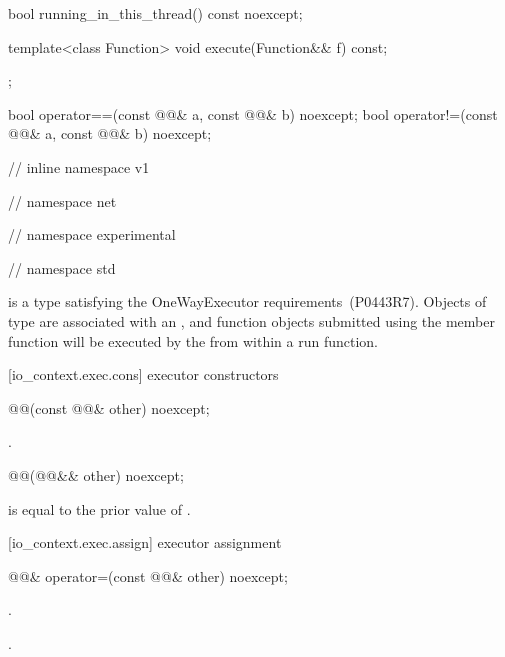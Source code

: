 \begin{codeblock}
{{{{{    bool running_in_this_thread() const noexcept;

    template<class Function>
      void execute(Function&& f) const;
  };

  bool operator==(const @@& a, const @@& b) noexcept;
  bool operator!=(const @@& a, const @@& b) noexcept;

} // inline namespace v1
} // namespace net
} // namespace experimental
} // namespace std
\end{codeblock}

\pnum
{} is a type satisfying the OneWayExecutor requirements~(P0443R7). Objects of type  are associated with an , and function objects submitted using the  member function will be executed by the  from within a run function.


[io_context.exec.cons]{ executor constructors}

%
\begin{itemdecl}
@@(const @@& other) noexcept;
\end{itemdecl}

\begin{itemdescr}
\pnum
\postconditions {}.
\end{itemdescr}

\begin{itemdecl}
@@(@@&& other) noexcept;
\end{itemdecl}

\begin{itemdescr}
\pnum
\postconditions {} is equal to the prior value of .
\end{itemdescr}



[io_context.exec.assign]{ executor assignment}

%
\begin{itemdecl}
@@& operator=(const @@& other) noexcept;
\end{itemdecl}

\begin{itemdescr}
\pnum
\postconditions {}.

\pnum
\returns {}.
\end{itemdescr}

